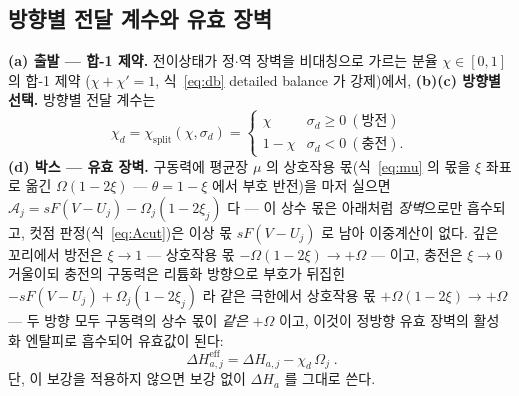 \documentclass[11pt,a4paper]{article}
\newcommand{\eff}{\mathrm{eff}}
\begin{document}
\subsection{방향별 전달 계수와 유효 장벽}
\textbf{(a) 출발 — 합-1 제약.} 전이상태가 정$\cdot$역 장벽을 비대칭으로 가르는 분율 $\chi\in[0,1]$ 의 합-1 제약
($\chi+\chi'=1$, 식~\eqref{eq:db} detailed balance 가 강제)에서, \textbf{(b)(c) 방향별 선택.} 방향별 전달 계수는
\begin{equation}
\chi_d=\chi_\mathrm{split}(\chi,\sigma_d)=
\begin{cases}\chi & \sigma_d\ge0\ (\text{방전})\\ 1-\chi & \sigma_d<0\ (\text{충전}).\end{cases}
\label{eq:chid}
\end{equation}
\textbf{(d) 박스 --- 유효 장벽.}
구동력에 평균장 $\mu$ 의 상호작용 몫(식~\eqref{eq:mu} 의 몫을 $\xi$ 좌표로 옮긴 $\Omega(1-2\xi)$ — $\theta=1-\xi$ 에서 부호 반전)을 마저 실으면
$\mathcal A_j=sF(V-U_j)-\Omega_j(1-2\xi_j)$ 다 — 이 상수 몫은 아래처럼 \emph{장벽}으로만 흡수되고, 컷점
판정(식~\eqref{eq:Acut})은 이상 몫 $sF(V-U_j)$ 로 남아 이중계산이 없다.
깊은 꼬리에서 방전은 $\xi\to1$ — 상호작용 몫
$-\Omega(1-2\xi)\to+\Omega$ — 이고, 충전은 $\xi\to0$ 거울이되 충전의 구동력은 리튬화 방향으로 부호가 뒤집힌
$-sF(V-U_j)+\Omega_j(1-2\xi_j)$ 라 같은 극한에서 상호작용 몫 $+\Omega(1-2\xi)\to+\Omega$ — 두 방향 모두
구동력의 상수 몫이 \emph{같은} $+\Omega$ 이고, 이것이 정방향 유효 장벽의 활성화 엔탈피로 흡수되어 유효값이 된다:
\begin{equation}
\boxed{\;\Delta H_{a,j}^\eff=\Delta H_{a,j}-\chi_d\,\Omega_j\;.}
\label{eq:dHeff}
\end{equation}
단, 이 보강을 적용하지 않으면 보강 없이 $\Delta H_a$ 를 그대로 쓴다.
\end{document}
